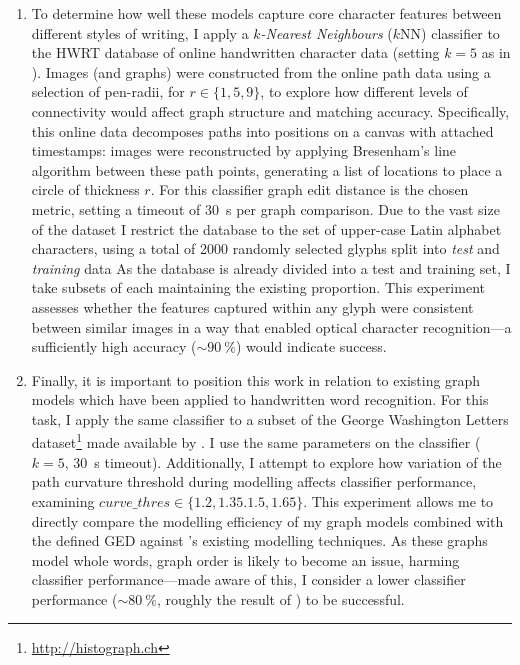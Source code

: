 \documentclass{mpaper}
\begin{document}
\begin{enumerate}
	\item To determine how well these models capture core character features between different styles of writing, I apply a \emph{$k$-Nearest Neighbours} ($k$NN) classifier to the HWRT database of online handwritten character data \cite{HwrtDatabase} (setting $k=5$ as in \cite{Graphs-Handwriting}).
	Images (and graphs) were constructed from the online path data using a selection of pen-radii, for $r \in \{1,5,9\}$, to explore how different levels of connectivity would affect graph structure and matching accuracy.
	Specifically, this online data decomposes paths into positions on a canvas with attached timestamps: images were reconstructed by applying Bresenham's line algorithm between these path points, generating a list of locations to place a circle of thickness $r$.
	For this classifier graph edit distance is the chosen metric, setting a timeout of \SI{30}{\second} per graph comparison.
	Due to the vast size of the dataset I restrict the database to the set of upper-case Latin alphabet characters, using a total of 2000 randomly selected glyphs split into \emph{test} and \emph{training} data
	As the database is already divided into a test and training set, I take subsets of each maintaining the existing proportion.
	This experiment assesses whether the features captured within any glyph were consistent between similar images in a way that enabled optical character recognition---a sufficiently high accuracy ($\sim\SI{90}{\percent}$) would indicate success.
	
	\item Finally, it is important to position this work in relation to existing graph models which have been applied to handwritten word recognition.
	For this task, I apply the same classifier to a subset of the George Washington Letters dataset\footnote{\url{http://histograph.ch}} made available by \citeauthor{Graphs-Handwriting} \cite{Graphs-Handwriting}.
	I use the same parameters on the classifier ($k=5$, \SI{30}{\second} timeout).
	Additionally, I attempt to explore how variation of the path curvature threshold during modelling affects classifier performance, examining $\mathit{curve\_thres} \in \{1.2, 1.35. 1.5, 1.65\}$.
	This experiment allows me to directly compare the modelling efficiency of my graph models combined with the defined GED against \citeauthor{Graphs-Handwriting}'s existing modelling techniques.
	As these graphs model whole words, graph order is likely to become an issue, harming classifier performance---made aware of this, I consider a lower classifier performance ($\sim\SI{80}{\percent}$, roughly the result of \citeauthor{Graphs-Handwriting}) to be successful.
\end{enumerate}
\end{document}
